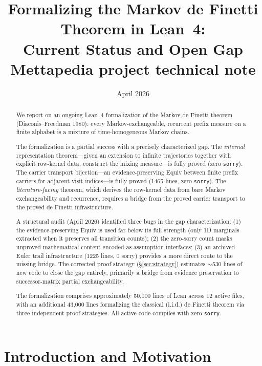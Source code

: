 \documentclass[11pt]{article}
\title{Formalizing the Markov de Finetti Theorem in Lean~4:\\
  Current Status and Open Gap\\[0.3em]
  {\large Mettapedia project technical note}}
\author{}
\date{April 2026}
\theoremstyle{definition}
\begin{document}
\maketitle

\begin{abstract}
We report on an ongoing Lean~4 formalization of the Markov de Finetti theorem
(Diaconis--Freedman 1980): every Markov-exchangeable, recurrent prefix measure
on a finite alphabet is a mixture of time-homogeneous Markov chains.

The formalization is a partial success with a precisely characterized gap.
The \emph{internal} representation theorem---given an extension to infinite
trajectories together with explicit row-kernel data, construct the mixing
measure---is fully proved (zero \texttt{sorry}).  The carrier transport
bijection---an evidence-preserving Equiv between finite prefix carriers
for adjacent visit indices---is fully proved (1465 lines, zero \texttt{sorry}).
The \emph{literature-facing} theorem, which derives the row-kernel data
from bare Markov exchangeability and recurrence, requires a bridge from
the proved carrier transport to the proved de Finetti infrastructure.

A structural audit (April 2026) identified three bugs in the gap
characterization: (1) the evidence-preserving Equiv is used far below
its full strength (only 1D marginals extracted when it preserves all
transition counts); (2) the zero-sorry count masks unproved mathematical
content encoded as assumption interfaces; (3) an archived Euler trail
infrastructure (1225 lines, 0 sorry) provides a more direct route to
the missing bridge.  The corrected proof strategy (\S\ref{sec:strategy})
estimates $\sim$530 lines of new code to close the gap entirely,
primarily a bridge from evidence preservation to successor-matrix
partial exchangeability.

The formalization comprises approximately 50{,}000 lines of Lean across
12 active files, with an additional 43{,}000 lines formalizing the classical
(i.i.d.) de Finetti theorem via three independent proof strategies.
All active code compiles with zero \texttt{sorry}.
\end{abstract}

\tableofcontents

\section{Introduction and Motivation}
\end{document}
